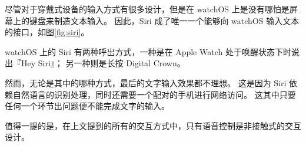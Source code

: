尽管对于穿戴式设备的输入方式有很多设计，但是在 watchOS 上是没有哪怕是屏幕上的键盘来制造文本输入。
因此，Siri 成了唯一一个能够向 watchOS 输入文本的接口，如图\ref{fig:siri}。

watchOS 上的 Siri 有两种呼出方式，一种是在 Apple Watch 处于唤醒状态下时说出『Hey Siri』；
另一种则是长按 Digital Crown。

然而，无论是其中的哪种方式，最后的文字输入效果都不理想。
这是因为 Siri 依赖自然语言的识别处理，同时还需要一个配对的手机进行网络访问。
这其中只要任何一个环节出问题便不能完成文字的输入。

值得一提的是，在上文提到的所有的交互方式中，只有语音控制是非接触式的交互设计。

\cleardoublepage
